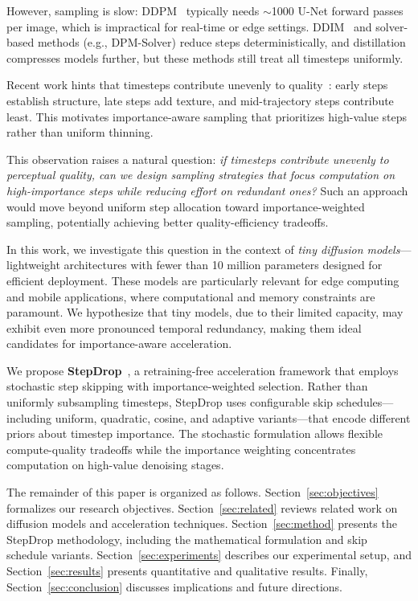 \documentclass{article}
\begin{document}
However, sampling is slow: DDPM~\citep{ho2020denoising} typically needs $\sim$1000 U-Net forward passes per image, which is impractical for real-time or edge settings. DDIM~\citep{song2020denoising} and solver-based methods (e.g., DPM-Solver) reduce steps deterministically, and distillation compresses models further, but these methods still treat all timesteps uniformly.

Recent work hints that timesteps contribute unevenly to quality~\citep{wang2024s2dms, xue2024accelerating}: early steps establish structure, late steps add texture, and mid-trajectory steps contribute least. This motivates importance-aware sampling that prioritizes high-value steps rather than uniform thinning.

This observation raises a natural question: \emph{if timesteps contribute unevenly to perceptual quality, can we design sampling strategies that focus computation on high-importance steps while reducing effort on redundant ones?} Such an approach would move beyond uniform step allocation toward importance-weighted sampling, potentially achieving better quality-efficiency tradeoffs.

In this work, we investigate this question in the context of \emph{tiny diffusion models}—lightweight architectures with fewer than 10 million parameters designed for efficient deployment. These models are particularly relevant for edge computing and mobile applications, where computational and memory constraints are paramount. We hypothesize that tiny models, due to their limited capacity, may exhibit even more pronounced temporal redundancy, making them ideal candidates for importance-aware acceleration.

We propose \textbf{StepDrop}~\citep{martins2025stepdrop}, a retraining-free acceleration framework that employs stochastic step skipping with importance-weighted selection. Rather than uniformly subsampling timesteps, StepDrop uses configurable skip schedules—including uniform, quadratic, cosine, and adaptive variants—that encode different priors about timestep importance. The stochastic formulation allows flexible compute-quality tradeoffs while the importance weighting concentrates computation on high-value denoising stages.

The remainder of this paper is organized as follows. Section~\ref{sec:objectives} formalizes our research objectives. Section~\ref{sec:related} reviews related work on diffusion models and acceleration techniques. Section~\ref{sec:method} presents the StepDrop methodology, including the mathematical formulation and skip schedule variants. Section~\ref{sec:experiments} describes our experimental setup, and Section~\ref{sec:results} presents quantitative and qualitative results. Finally, Section~\ref{sec:conclusion} discusses implications and future directions.
\end{document}
